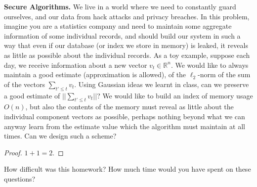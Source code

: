 \documentclass[solution,addpoints,12pt]{exam}
\begin{document}
\begin{questions}

\question[20] \textbf{Secure Algorithms.}  We live in a world where we need to constantly guard ourselves, and our data from hack attacks and privacy breaches. In this problem, imagine you are a statistics company and need to maintain some aggregate information of some individual records, and should build our system in such a way that even if our database (or index we store in memory) is leaked, it reveals as little as possible about the individual records. As a toy example, suppose each day, we receive information about a new vector $v_t \in \mathbb{R}^n$. We would like to always maintain a good estimate (approximation is allowed), of the $\ell_2$-norm of the sum of the vectors $\sum_{t' \leq t } v_t$. Using Gaussian ideas we learnt in class, can we preserve a good estimate of $|| \sum_{t' \leq t} v_t ||$? We would like to build an index of memory usage $O(n)$, but also the contents of the memory must reveal as little about the individual component vectors as possible, perhaps nothing beyond what we can anyway learn from the estimate value which the algorithm must maintain at all times. Can we design such a scheme? 

\begin{solution}
	\begin{proof}
		$1 + 1 = 2$.
	\end{proof}
\end{solution}



 How difficult was this homework? How much time would you have spent on these questions?



\end{questions}
\end{document}
